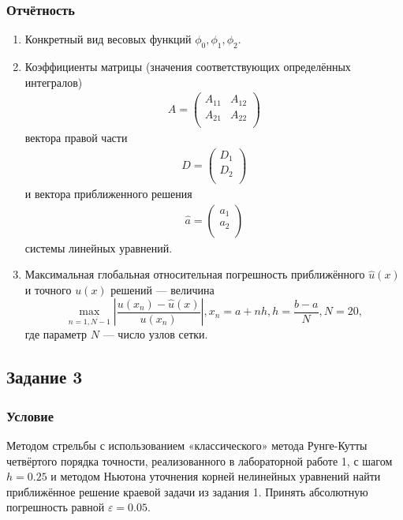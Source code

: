 \documentclass[oneside, final, 12pt]{article}
\begin{document}
\subsubsection{Отчётность}
\begin{enumerate}
    \item Конкретный вид весовых функций $\phi_0, \phi_1, \phi_2$.
    \item Коэффициенты матрицы (значения соответствующих определённых интегралов)
    \begin{align*}
      A = \begin{pmatrix}
    A_{11} & A_{12} \\
    A_{21} & A_{22} \\
   \end{pmatrix}
    \end{align*}
    вектора правой части
    \begin{align*}
      D = \begin{pmatrix}
    D_{1} \\
    D_{2} \\
   \end{pmatrix}
    \end{align*}
    и вектора приближенного решения
    \begin{align*}
      \hat{a} = \begin{pmatrix}
    a_{1} \\
    a_{2} \\
   \end{pmatrix}
    \end{align*}
    системы линейных уравнений.
    \item Максимальная глобальная относительная погрешность приближённого $\hat{u} (x)$ и точного $u(x)$  решений — величина \begin{equation*}
        \max\limits_{n = \overline{1, N-1}} \left| \dfrac{u(x_n) - \hat{u}(x)}{u(x_n)} \right|, x_n = a + n h, h = \dfrac{b - a}{N}, N = 20,
    \end{equation*}
    где параметр $N$ — число узлов сетки.
\end{enumerate}

\subsection{Задание 3}
\subsubsection{Условие}
Методом стрельбы с использованием «классического» метода Рунге-Кутты четвёртого порядка точности, реализованного в лабораторной работе 1, с шагом $h = 0.25$  и методом Ньютона уточнения корней нелинейных уравнений найти приближённое решение краевой задачи из задания 1. Принять абсолютную погрешность равной $\varepsilon = 0.05$.
\end{document}
